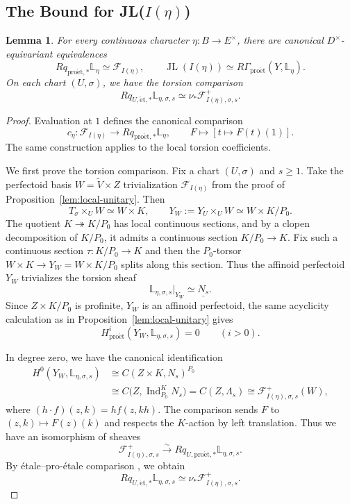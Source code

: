 \documentclass[11pt]{article}
\newtheorem{lemma}[theorem]{Lemma}
\theoremstyle{definition}
\newcommand{\cF}{\mathcal F}
\newcommand{\proet}{\mathrm{pro\acute et}}
\newcommand{\et}{\mathrm{\acute et}}
\newcommand{\Ind}{\operatorname{Ind}}
\newcommand{\JL}{\operatorname{JL}}
\begin{document}
\subsection{The Bound for JL(\texorpdfstring{$I(\eta)$}{ })} 
\begin{lemma}%
\label{lem:arithmetic-parabolic-Shapiro}
For every continuous character \(\eta:B\to E^\times\), there
are canonical \(D^\times\)-equivariant equivalences
\begin{equation*}
 Rq_{\proet,*}\mathbb L_\eta\simeq\cF_{I(\eta)},
 \qquad
 \JL(I(\eta))\simeq R\Gamma_{\proet}(Y,\mathbb L_\eta).
\end{equation*}
On each chart \((U,\sigma)\), we have the torsion comparison
\begin{equation*}
 Rq_{U,\et,*}\mathbb L_{\eta,\sigma,s}
 \simeq\nu_*\cF_{I(\eta),\sigma,s}^+.
\end{equation*}
\end{lemma}\begin{proof}
Evaluation at $1$ defines the canonical comparison
\begin{equation}\label{eq:arithmetic-parabolic-comparison-map}
 c_\eta:\cF_{I(\eta)}
 \longrightarrow Rq_{\proet,*}\mathbb L_\eta,
 \qquad F\longmapsto[t\longmapsto F(t)(1)].
\end{equation}
The same construction applies to the local torsion coefficients.

We first prove the torsion comparison. Fix a chart $(U,\sigma)$ and $s\geq1$.
Take the perfectoid basis $W=\widetilde V\times Z$ trivialization $\cF_{I(\eta)}$ 
from the proof of Proposition~\ref{lem:local-unitary}. Then
\[
 T_\sigma\times_UW\simeq W\times K,
 \qquad
 Y_W:=Y_U\times_UW\simeq W\times K/P_0.
\]
The quotient $K\twoheadrightarrow K/P_0$ has local continuous sections, 
and by a clopen decomposition of $K/P_0$, it admits a continuous section $K/P_0\to K$. 
Fix such a continuous section $\tau:K/P_0\to K$ and then the $P_0$-torsor
$W\times K\to Y_W=W\times K/P_0$ splits along this section.
Thus the affinoid perfectoid $Y_W$ trivializes the torsion sheaf
\[
 \mathbb L_{\eta,\sigma,s}|_{Y_W}\simeq\underline{N_s}.
\]
Since $Z\times K/P_0$ is profinite, $Y_W$ is an affinoid perfectoid, the same acyclicity
calculation as in Proposition~\ref{lem:local-unitary} gives
\[
 H^i_{\proet}(Y_W,\mathbb L_{\eta,\sigma,s})=0
 \qquad(i>0).
\]

In degree zero, we have the canonical identification
\begin{align*}
 H^0(Y_W,\mathbb L_{\eta,\sigma,s})
 &\cong C(Z\times K,N_s)^{P_0}\\
 &\cong C\bigl(Z,\Ind_{P_0}^K N_s\bigr)
 = C(Z,\Lambda_s)
 \cong\cF_{I(\eta),\sigma,s}^+(W),
\end{align*}
where $(h\cdot f)(z,k)=h f(z,kh)$.
The comparison sends $F$ to $(z,k)\mapsto F(z)(k)$ and
respects the $K$-action by left translation. Thus we have an isomorphism of sheaves
\[
 \cF_{I(\eta),\sigma,s}^+
 \xrightarrow{\sim}
 Rq_{U,\proet,*}\mathbb L_{\eta,\sigma,s}.
\]
By étale--pro-étale comparison
\cite[Proposition~14.8 and Corollary~16.7]{ScholzeDiamonds},
we obtain
\[
 Rq_{U,\et,*}\mathbb L_{\eta,\sigma,s}
 \simeq\nu_*\cF_{I(\eta),\sigma,s}^+.
\]


\end{proof}
\end{document}
